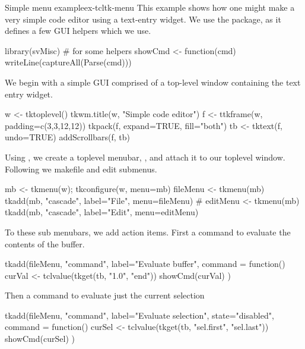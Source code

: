 \begin{example}{Simple menu example}{ex-tcltk-menu}
This example shows how one might make a very simple code editor using
a text-entry widget. We use the  package, as it defines a
few GUI helpers which we use.
\begin{Schunk}
\begin{Sinput}
 library(svMisc)                         # for some helpers
 showCmd <- function(cmd) writeLine(captureAll(Parse(cmd)))
\end{Sinput}
\end{Schunk}

We begin with a simple GUI comprised of a top-level window containing
the text entry widget.
\begin{Schunk}
\begin{Sinput}
 w <- tktoplevel()
 tkwm.title(w, "Simple code editor")
 f <- ttkframe(w, padding=c(3,3,12,12)) 
 tkpack(f, expand=TRUE, fill="both")
 tb <- tktext(f, undo=TRUE)
 addScrollbars(f, tb)
\end{Sinput}
\end{Schunk}
%

Using , we create a toplevel menubar, , and
attach it to our toplevel window. Following we makefile and edit submenus.
\begin{Schunk}
\begin{Sinput}
 mb <- tkmenu(w); tkconfigure(w, menu=mb)
 fileMenu <- tkmenu(mb)
 tkadd(mb, "cascade", label="File", menu=fileMenu)
 #
 editMenu <- tkmenu(mb)
 tkadd(mb, "cascade", label="Edit", menu=editMenu)
\end{Sinput}
\end{Schunk}
%

To these sub menubars, we add action items. First a command to
evaluate the contents of the buffer.
\begin{Schunk}
\begin{Sinput}
 tkadd(fileMenu, "command", label="Evaluate buffer",
       command = function() {
         curVal <- tclvalue(tkget(tb, "1.0", "end"))
         showCmd(curVal)
       })
\end{Sinput}
\end{Schunk}

Then a command to evaluate just the current selection
\begin{Schunk}
\begin{Sinput}
 tkadd(fileMenu, "command", label="Evaluate selection",
       state="disabled",
       command = function() {
         curSel <- tclvalue(tkget(tb, "sel.first", "sel.last"))
         showCmd(curSel)
       })
\end{Sinput}
\end{Schunk}


\end{example}
